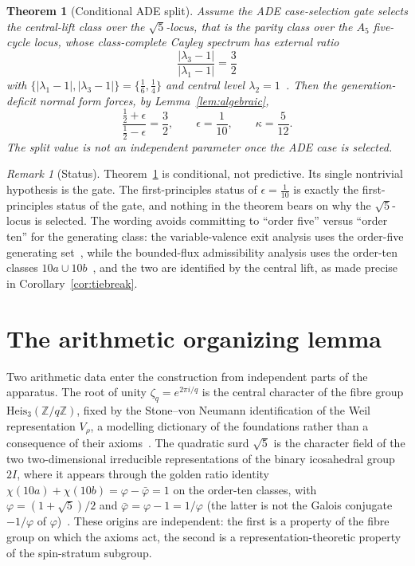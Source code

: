 \documentclass[11pt]{article}
\newtheorem{theorem}{Theorem}
\theoremstyle{definition}
\theoremstyle{remark}
\newtheorem{remark}{Remark}
\newcommand{\Heis}{\mathrm{Heis}_3(\mathbb{Z}/q\mathbb{Z})}
\begin{document}
    \begin{theorem}[Conditional ADE split]
      \label{thm:conditional}
      Assume the ADE case-selection gate selects the central-lift class over the $\sqrt{5}$-locus, that is the parity
      class over the $A_5$ five-cycle locus, whose class-complete Cayley spectrum has external ratio
      \[
        \frac{|\lambda_3-1|}{|\lambda_1-1|}=\frac{3}{2}
      \]
      with $\{|\lambda_1-1|,|\lambda_3-1|\}=\{\tfrac{1}{6},\tfrac{1}{4}\}$ and central level
      $\lambda_2=1$~\cite{Beau2026a6,Beau2026a4}.
      Then the generation-deficit normal form forces, by Lemma~\ref{lem:algebraic},
      \[
        \frac{\tfrac{1}{2}+\epsilon}{\tfrac{1}{2}-\epsilon}=\frac{3}{2},\qquad
        \epsilon=\frac{1}{10},\qquad \kappa=\frac{5}{12}.
      \]
      The split value is not an independent parameter once the ADE case is selected.
    \end{theorem}

    \begin{remark}[Status]
      \label{rem:status}
Theorem~\ref{thm:conditional} is conditional, not predictive.
Its single nontrivial hypothesis is the gate.
The first-principles status of $\epsilon=\tfrac{1}{10}$ is exactly the first-principles status of the gate, and
nothing in the theorem bears on why the $\sqrt{5}$-locus is selected.
The wording avoids committing to ``order five'' versus ``order ten'' for the generating class: the variable-valence
exit analysis uses the order-five generating set~\cite{Beau2026a6}, while the bounded-flux admissibility analysis
uses the order-ten classes $10a\cup 10b$~\cite{Beau2026a1}, and the two are identified by the central lift, as made
precise in Corollary~\ref{cor:tiebreak}.
    \end{remark}

  \section{The arithmetic organizing lemma}
    \label{sec:organizing}

    Two arithmetic data enter the construction from independent parts of the apparatus.
    The root of unity $\zeta_q=e^{2\pi i/q}$ is the central character of the fibre group $\Heis$, fixed by the
    Stone--von Neumann identification of the Weil representation $V_\rho$, a modelling dictionary of the foundations
    rather than a consequence of their axioms~\cite{Beau2026m,Beau2026HeisenbergStructure}.
    The quadratic surd $\sqrt{5}$ is the character field of the two two-dimensional irreducible representations of the
    binary icosahedral group $2I$, where it appears through the golden ratio identity
    $\chi(10a)+\chi(10b)=\varphi-\bar\varphi=1$ on the order-ten classes, with $\varphi=(1+\sqrt{5})/2$ and
    $\bar\varphi=\varphi-1=1/\varphi$ (the latter is not the Galois conjugate $-1/\varphi$ of $\varphi$)~\cite{Beau2026a1}.
    These origins are independent: the first is a property of the fibre group on which the axioms act, the second is a
    representation-theoretic property of the spin-stratum subgroup.
\end{document}
